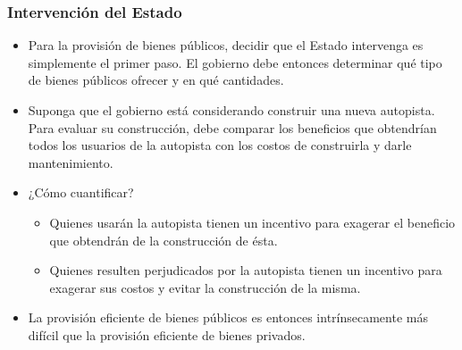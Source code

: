 \documentclass{beamer}
\begin{document}
\begin{frame}
\frametitle{Intervención del Estado}
\begin{itemize}
\item Para la provisión de bienes públicos, decidir que el Estado intervenga es simplemente el primer paso. El gobierno debe entonces determinar qué tipo de bienes públicos ofrecer y en qué cantidades.
\item  Suponga que el gobierno está considerando construir una nueva autopista. Para evaluar su construcción, debe comparar los beneficios que obtendrían todos los usuarios de la autopista con los costos de construirla y darle mantenimiento. 
\item ¿Cómo cuantificar?
    \begin{itemize}
    \item Quienes usarán la autopista tienen un incentivo para exagerar el beneficio que obtendrán de la construcción de ésta.
    \item Quienes resulten perjudicados por la autopista tienen un incentivo para exagerar sus costos y evitar la construcción de la misma.
    \end{itemize}
\item La provisión eficiente de bienes públicos es entonces intrínsecamente más difícil que la provisión eficiente de bienes privados. 
\end{itemize}
\end{frame}
\end{document}
